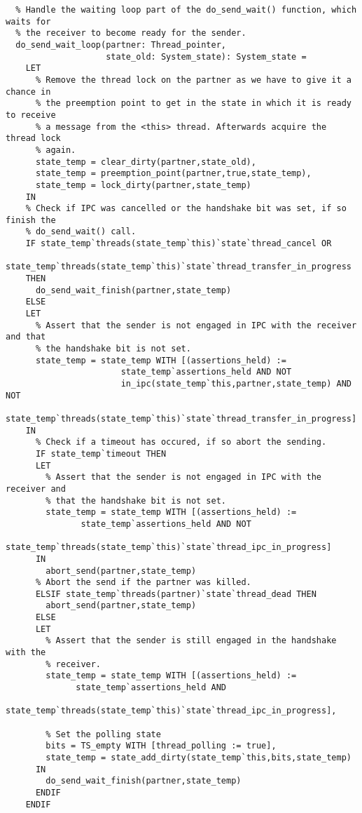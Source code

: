 \begin{lstlisting}
  % Handle the waiting loop part of the do_send_wait() function, which waits for
  % the receiver to become ready for the sender.
  do_send_wait_loop(partner: Thread_pointer,
                    state_old: System_state): System_state =
    LET
      % Remove the thread lock on the partner as we have to give it a chance in
      % the preemption point to get in the state in which it is ready to receive
      % a message from the <this> thread. Afterwards acquire the thread lock
      % again.
      state_temp = clear_dirty(partner,state_old),
      state_temp = preemption_point(partner,true,state_temp),
      state_temp = lock_dirty(partner,state_temp)
    IN
    % Check if IPC was cancelled or the handshake bit was set, if so finish the
    % do_send_wait() call.
    IF state_temp`threads(state_temp`this)`state`thread_cancel OR 
       state_temp`threads(state_temp`this)`state`thread_transfer_in_progress
    THEN
      do_send_wait_finish(partner,state_temp)
    ELSE
    LET
      % Assert that the sender is not engaged in IPC with the receiver and that
      % the handshake bit is not set.
      state_temp = state_temp WITH [(assertions_held) := 
                       state_temp`assertions_held AND NOT 
                       in_ipc(state_temp`this,partner,state_temp) AND NOT 
         state_temp`threads(state_temp`this)`state`thread_transfer_in_progress]
    IN
      % Check if a timeout has occured, if so abort the sending.
      IF state_temp`timeout THEN
      LET
        % Assert that the sender is not engaged in IPC with the receiver and
        % that the handshake bit is not set.
        state_temp = state_temp WITH [(assertions_held) := 
               state_temp`assertions_held AND NOT 
               state_temp`threads(state_temp`this)`state`thread_ipc_in_progress]
      IN
        abort_send(partner,state_temp)
      % Abort the send if the partner was killed.
      ELSIF state_temp`threads(partner)`state`thread_dead THEN
        abort_send(partner,state_temp)
      ELSE
      LET
        % Assert that the sender is still engaged in the handshake with the
        % receiver.
        state_temp = state_temp WITH [(assertions_held) := 
              state_temp`assertions_held AND 
              state_temp`threads(state_temp`this)`state`thread_ipc_in_progress],

        % Set the polling state
        bits = TS_empty WITH [thread_polling := true], 
        state_temp = state_add_dirty(state_temp`this,bits,state_temp)
      IN
        do_send_wait_finish(partner,state_temp)
      ENDIF
    ENDIF 
  

\end{lstlisting}
